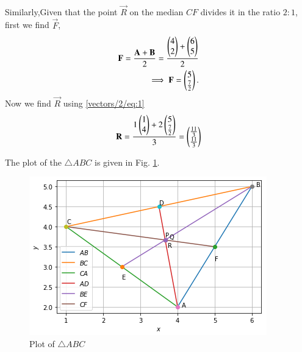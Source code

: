 \begin{enumerate}[label=\alph*.]
\begin{align}
    \end{align}
    Similarly,Given that the point $\vec{R}$ on the median $CF$ divides it in the ratio $2:1$, first we find $\vec{F}$,
    \begin{align}
        \mathbf{F} =\frac{\mathbf{A}+\mathbf{B}}{2} = \frac{\begin{pmatrix}4 \\ 2\end{pmatrix}+\begin{pmatrix}6 \\ 5\end{pmatrix}}{2}\\
        \implies \mathbf{F} = \begin{pmatrix}5 \\ \frac{7}{2}\end{pmatrix}.
    \end{align}
    Now we find $\vec{R}$ using \eqref{vectors/2/eq:1}
    \begin{align}
       \mathbf{R}=\frac{1\begin{pmatrix}1\\4\end{pmatrix}+2\begin{pmatrix}5 \\ \frac{7}{2}\end{pmatrix}}{3}=\begin{pmatrix}\frac{11}{3} \\ \frac{11}{3}\end{pmatrix} 
    \end{align}
    \end{enumerate}
    The plot of the $\triangle ABC$ is given in Fig.     \ref{vectors/2/fig:triangle ABC}.
    \begin{figure}[ht]
        \centering
        \includegraphics[width=\columnwidth]{solutions/su2021/2/2/TriangleABC.PNG}
        \caption{Plot of $\triangle ABC$}
        \label{vectors/2/fig:triangle ABC}
    \end{figure}